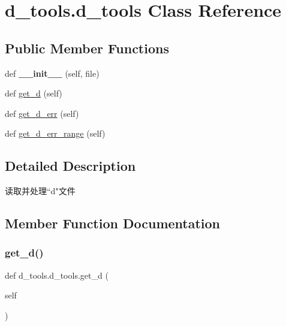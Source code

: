 \hypertarget{classd__tools_1_1d__tools}{}\section{d\+\_\+tools.\+d\+\_\+tools Class Reference}
\label{classd__tools_1_1d__tools}
\subsection*{Public Member Functions}
\begin{DoxyCompactItemize}
\item 
\mbox{\label{classd__tools_1_1d__tools_aab930ce66b431652086dcf347cb62fef}} 
def {\bfseries \+\_\+\+\_\+init\+\_\+\+\_\+} (self, file)
\item 
def \hyperlink{classd__tools_1_1d__tools_a05c22880730c0e8b1e245c3875eb8610}{get\+\_\+d} (self)
\item 
def \hyperlink{classd__tools_1_1d__tools_a5dcd3de99d3f89d30ef89524f05893f0}{get\+\_\+d\+\_\+err} (self)
\item 
def \hyperlink{classd__tools_1_1d__tools_a83ab510f3abfa1ca21697cbea59b4272}{get\+\_\+d\+\_\+err\+\_\+range} (self)
\end{DoxyCompactItemize}


\subsection{Detailed Description}
\begin{DoxyVerb}读取并处理“d"文件\end{DoxyVerb}
 

\subsection{Member Function Documentation}
\mbox{\label{classd__tools_1_1d__tools_a05c22880730c0e8b1e245c3875eb8610}} 
\subsubsection{\texorpdfstring{get\+\_\+d()}{get\_d()}}
{\footnotesize\ttfamily def d\+\_\+tools.\+d\+\_\+tools.\+get\+\_\+d (\begin{DoxyParamCaption}\item[{}]{self }\end{DoxyParamCaption})}

